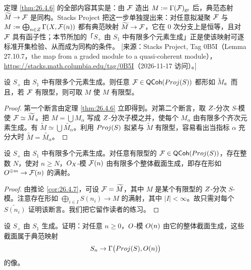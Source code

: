 \begin{yizhu}
定理 \ref{thm:26.4.6} 的全部内容其实是：由 $\mathcal{F}$ 造出 $M := \Gamma(\mathcal{F})_{\mathrm{gr}}$ 后，典范态射 $\widetilde{M} \to \mathcal{F}$ 是同构。Stacks Project 把这一步单独提出来：对任意拟凝聚 $\mathcal{F}$ 与 $M := \bigoplus_{n \in Z} \Gamma(X, \mathcal{F}(n))$ 都有典范映射 $\widetilde{M} \to \mathcal{F}$，它在 $0$ 次分支上是恒等，且对 $\mathcal{F}$ 具有函子性；本节所加的「$S_+$ 由 $S_1$ 中有限多个元素生成」正是使该映射可逐标准开集检验、从而成为同构的条件。
[来源：Stacks Project, Tag 0B5I（Lemma 27.10.7，the map from a graded module to a quasi-coherent module），\url{https://stacks.math.columbia.edu/tag/0B5I}（2026-11-17 访问）。]
\end{yizhu}

\begin{corollary}\label{cor:26.4.7}
设 $S_+$ 由 $S_1$ 中有限多个元素生成。则任意 $\mathcal{F} \in \mathsf{QCoh}(Proj(S))$ 都形如 $\widetilde{M}$。而且，若 $\mathcal{F}$ 有限型，则可取 $M$ 使 $M$ 有限型。
\end{corollary}

\begin{proof}
第一个断言由定理 \ref{thm:26.4.6} 立即得到。对第二个断言，取 $Z$-分次 $S$-模使 $\mathcal{F} \simeq \widetilde{M}$。把 $M = \bigcup M_\alpha$ 写成 $Z$-分次子模之并，使每个 $M_\alpha$ 由有限多个齐次元素生成。有 $\widetilde{M} \simeq \bigcup \widetilde{M_\alpha}$。利用 $Proj(S)$ 拟紧与 $\widetilde{M}$ 有限型，容易看出当指标 $\alpha$ 充分大时 $\widetilde{M} = \widetilde{M_\alpha}$。
\end{proof}

\begin{proposition}\label{prop:26.4.8}
设 $S_+$ 由 $S_1$ 中有限多个元素生成。对任意有限型的 $\mathcal{F} \in \mathsf{QCoh}(Proj(S))$，存在整数 $N$，使对 $n \ge N$，$O_X$-模 $\mathcal{F}(n)$ 由有限多个整体截面生成，即存在形如 $O^{\oplus m} \to \mathcal{F}(n)$ 的满射。
\end{proposition}

\begin{proof}
由推论 \ref{cor:26.4.7}，可设 $\mathcal{F} = \widetilde{M}$，其中 $M$ 是某个有限型的 $Z$-分次 $S$-模。注意存在形如 $\bigoplus_{i \in I} S(n_i) \to M$ 的满射，其中 $|I| < \infty$。故只需对每个 $\widetilde{S(n_i)}$ 证明该断言。我们把它留作读者的练习。
\end{proof}

\begin{exercise}\label{exc:26.4.9}
设 $S_+$ 由 $S_1$ 生成。证明：对任意 $n \ge 0$，$O$-模 $O(n)$ 由它的整体截面生成，这些截面属于典范映射
\[
S_n \to \Gamma\bigl(Proj(S), O(n)\bigr)
\]
的像。
\end{exercise}

